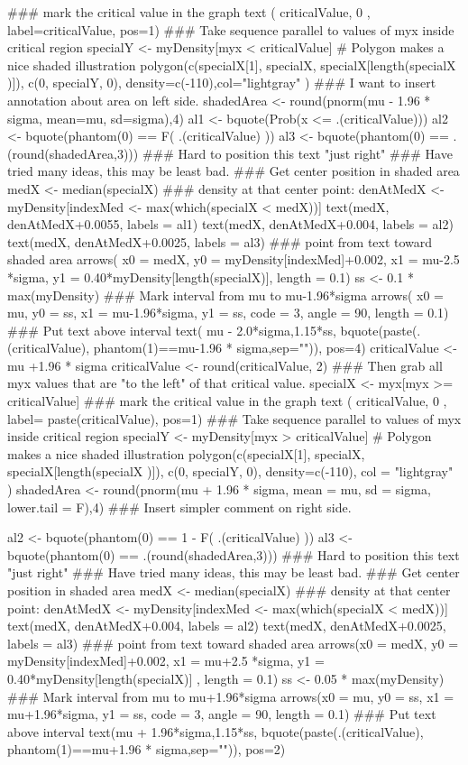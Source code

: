 \begin{Schunk}
\begin{Sinput}
 ### mark the critical value in the graph
 text ( criticalValue, 0 ,
       label=criticalValue, pos=1)
 ### Take sequence parallel to values of myx inside critical region
 specialY <- myDensity[myx < criticalValue]
 #  Polygon makes a nice shaded illustration
 polygon(c(specialX[1], specialX, specialX[length(specialX )]), c(0, specialY, 0), density=c(-110),col="lightgray" )
 ### I want to insert annotation about area on left side.
 shadedArea <- round(pnorm(mu - 1.96 * sigma, mean=mu, sd=sigma),4)
 al1 <- bquote(Prob(x <= .(criticalValue)))
 al2 <- bquote(phantom(0) == F( .(criticalValue) ))
 al3 <- bquote(phantom(0) == .(round(shadedArea,3)))
 ### Hard to position this text "just right"
 ### Have tried many ideas, this may be least bad.
 ### Get center position in shaded area
 medX <- median(specialX)
 ### density at that center point:
 denAtMedX <- myDensity[indexMed <- max(which(specialX < medX))]
 text(medX, denAtMedX+0.0055, labels = al1)
 text(medX, denAtMedX+0.004, labels = al2)
 text(medX, denAtMedX+0.0025, labels = al3)
 ### point from text toward shaded area
 arrows( x0 = medX, y0 = myDensity[indexMed]+0.002,
        x1 = mu-2.5 *sigma, y1 = 0.40*myDensity[length(specialX)], length = 0.1)
 ss <- 0.1 * max(myDensity)
 ### Mark interval from mu to mu-1.96*sigma
 arrows( x0 = mu, y0 = ss, x1 = mu-1.96*sigma, y1 = ss, code = 3, angle = 90, length = 0.1)
 ### Put text above interval
 text( mu - 2.0*sigma,1.15*ss, bquote(paste(.(criticalValue), phantom(1)==mu-1.96 * sigma,sep="")), pos=4)
 criticalValue <- mu +1.96 * sigma
 criticalValue <- round(criticalValue, 2)
 ### Then grab all myx values that are "to the left" of that critical value.
 specialX <-  myx[myx >= criticalValue]
 ### mark the critical value in the graph
 text ( criticalValue, 0 , label= paste(criticalValue), pos=1)
 ### Take sequence parallel to values of myx inside critical region
 specialY <- myDensity[myx > criticalValue]
 #  Polygon makes a nice shaded illustration
 polygon(c(specialX[1], specialX, specialX[length(specialX )]), c(0, specialY, 0), density=c(-110), col = "lightgray" )
 shadedArea <- round(pnorm(mu + 1.96 * sigma, mean = mu, sd = sigma, lower.tail = F),4)
 ### Insert simpler comment on right side.
 
 al2 <- bquote(phantom(0) == 1 - F( .(criticalValue) ))
 al3 <- bquote(phantom(0) == .(round(shadedArea,3)))
 ### Hard to position this text "just right"
 ### Have tried many ideas, this may be least bad.
 ### Get center position in shaded area
 medX <- median(specialX)
 ### density at that center point:
 denAtMedX <- myDensity[indexMed <- max(which(specialX < medX))]
 text(medX, denAtMedX+0.004, labels = al2)
 text(medX, denAtMedX+0.0025, labels = al3)
 ### point from text toward shaded area
 arrows(x0 = medX, y0 = myDensity[indexMed]+0.002, x1 = mu+2.5 *sigma, y1 = 0.40*myDensity[length(specialX)] ,   length = 0.1)
 ss <- 0.05 * max(myDensity)
 ### Mark interval from mu to mu+1.96*sigma
 arrows(x0 = mu, y0 = ss, x1 = mu+1.96*sigma, y1 = ss, code = 3, angle = 90, length = 0.1)
 ### Put text above interval
 text(mu + 1.96*sigma,1.15*ss, bquote(paste(.(criticalValue), phantom(1)==mu+1.96 * sigma,sep="")), pos=2)
\end{Sinput}
\end{Schunk}
